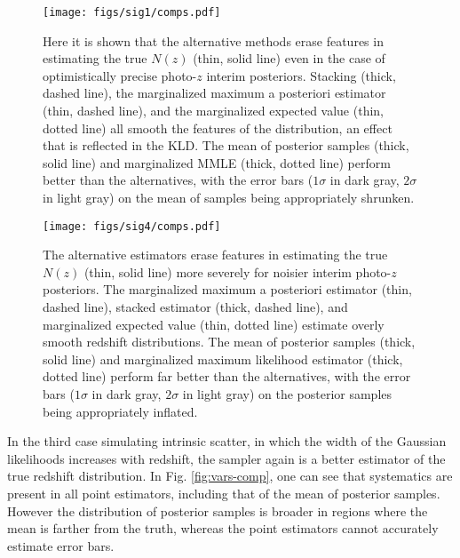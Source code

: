\begin{figure}
	\texttt{[image: figs/sig1/comps.pdf]}
	\caption{Here it is shown that the alternative methods erase features in 
		estimating the true $N(z)$ (thin, solid line) even in the case of 
		optimistically precise photo-$z$ interim posteriors.  Stacking (thick, dashed 
		line), the marginalized maximum a posteriori estimator (thin, dashed line), and 
		the marginalized expected value (thin, dotted line) all smooth the features of 
		the distribution, an effect that is reflected in the KLD.  The mean of 
		posterior samples (thick, solid line) and marginalized MMLE (thick, dotted 
		line) perform better than the alternatives, with the error bars ($1\sigma$ in 
		dark gray, $2\sigma$ in light gray) on the mean of samples being appropriately 
		shrunken.}
	\label{fig:sig1-comp}
\end{figure}

\begin{figure}
	\texttt{[image: figs/sig4/comps.pdf]}
	\caption{The alternative estimators erase features in estimating the true 
		$N(z)$ (thin, solid line) more severely for noisier interim photo-$z$ 
		posteriors.  The marginalized maximum a posteriori estimator (thin, dashed 
		line), stacked estimator (thick, dashed line), and marginalized expected value 
		(thin, dotted line) estimate overly smooth redshift distributions.  The mean of 
		posterior samples (thick, solid line) and marginalized maximum likelihood 
		estimator (thick, dotted line) perform far better than the alternatives, with 
		the error bars ($1\sigma$ in dark gray, $2\sigma$ in light gray) on the 
		posterior samples being appropriately inflated.}
	\label{fig:sig4-comp}
\end{figure}

In the third case simulating intrinsic scatter, in which the width of the 
Gaussian likelihoods increases with redshift, the sampler again is a better 
estimator of the true redshift distribution.  In Fig. \ref{fig:vars-comp}, one 
can see that systematics are present in all point estimators, including that of 
the mean of posterior samples.  However the distribution of posterior samples 
is broader in regions where the mean is farther from the truth, whereas the 
point estimators cannot accurately estimate error bars.

